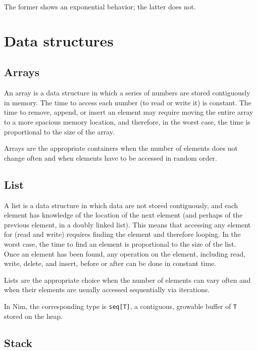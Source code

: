 \documentclass[justified, sixbynine]{tufte-book}
\def\ft{\small\tt}
\theoremstyle{plain}%
\newtheorem * {corollary}{Corollary}
\theoremstyle{definition}
\theoremstyle{remark}
\newtheorem * {remark}{Remark}
\newtheorem * {note}{Note}
\begin{document}
\begin{fullwidth}
The former shows an exponential behavior; the latter does not.

\goodbreak\section{Data structures}

\goodbreak\subsection{Arrays}

An array is a data structure in which a series of numbers are stored contiguously in memory. The time to access each number (to read or write it) is constant. The time to remove, append, or insert an element may require moving the entire array to a more spacious memory location, and therefore, in the worst case, the time is proportional to the size of the array.

Arrays are the appropriate containers when the number of elements does not change often and when elements have to be accessed in random order.

\goodbreak\subsection{List}

A list is a data structure in which data are not stored contiguously, and each element has knowledge of the location of the next element (and perhaps of the previous element, in a doubly linked list). This means that accessing any element for (read and write) requires finding the element and therefore looping. In the worst case, the time to find an element is proportional to the size of the list. Once an element has been found, any operation on the element, including read, write, delete, and insert, before or after can be done in constant time.

Lists are the appropriate choice when the number of elements can vary often and when their elements are usually accessed sequentially via iterations.

In Nim, the corresponding type is {\ft seq[T]}, a contiguous, growable buffer of {\ft T} stored on the heap.

\goodbreak\subsection{Stack}



\end{fullwidth}
\end{document}
